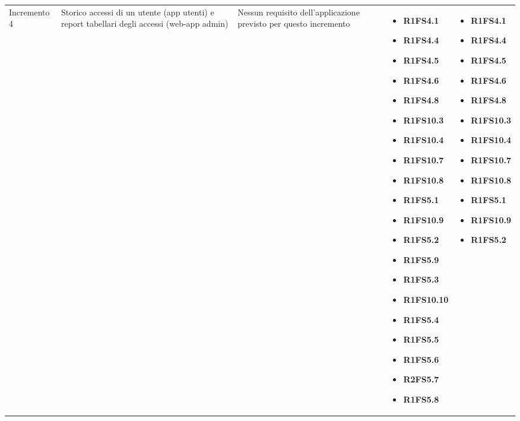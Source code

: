 {\begin{longtable}{C{2.5cm} C{3.2cm} C{2.8cm} C{2.8cm} C{2.8cm}}
Incremento 4 & Storico accessi di un utente (app utenti) e report tabellari degli accessi (web-app admin) &
    Nessun requisito dell'applicazione previsto per questo incremento
    & \begin{itemize} 
    \item[ ] \textbf{R1FS4.1}
    \item[ ] \textbf{R1FS4.4}
    \item[ ] \textbf{R1FS4.5}
    \item[ ] \textbf{R1FS4.6}
    \item[ ] \textbf{R1FS4.8}
    \item[ ] \textbf{R1FS10.3}
    \item[ ] \textbf{R1FS10.4}
    \item[ ] \textbf{R1FS10.7}
    \item[ ] \textbf{R1FS10.8}
    \item[ ] \textbf{R1FS5.1}
    \item[ ] \textbf{R1FS10.9}
    \item[ ] \textbf{R1FS5.2}
    \item[ ] \textbf{R1FS5.9}
    \item[ ] \textbf{R1FS5.3}
    \item[ ] \textbf{R1FS10.10}
    \item[ ] \textbf{R1FS5.4}
    \item[ ] \textbf{R1FS5.5}
    \item[ ] \textbf{R1FS5.6}
    \item[ ] \textbf{R2FS5.7}
    \item[ ] \textbf{R1FS5.8}
\end{itemize} & \begin{itemize} 
    \item[ ] \textbf{R1FS4.1}
    \item[ ] \textbf{R1FS4.4} 
    \item[ ] \textbf{R1FS4.5}
    \item[ ] \textbf{R1FS4.6}
    \item[ ] \textbf{R1FS4.8}
    \item[ ] \textbf{R1FS10.3}
    \item[ ] \textbf{R1FS10.4}
    \item[ ] \textbf{R1FS10.7}
    \item[ ] \textbf{R1FS10.8}
    \item[ ] \textbf{R1FS5.1}
    \item[ ] \textbf{R1FS10.9}
    \item[ ] \textbf{R1FS5.2}

\end{itemize}
\end{longtable}}
